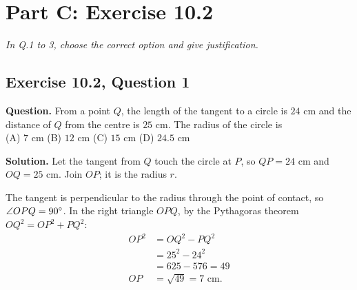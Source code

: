 \newpage
\section*{Part C: Exercise 10.2}

\textit{In Q.1 to 3, choose the correct option and give justification.}

\subsection*{Exercise 10.2, Question 1}
\textbf{Question.} From a point $Q$, the length of the tangent to a circle is $24$ cm and the distance of $Q$ from the centre is $25$ cm. The radius of the circle is\\
(A) $7$ cm \qquad (B) $12$ cm \qquad (C) $15$ cm \qquad (D) $24.5$ cm

\begin{center}
%
\end{center}

\textbf{Solution.} Let the tangent from $Q$ touch the circle at $P$, so $QP=24$ cm and $OQ=25$ cm. Join $OP$; it is the radius $r$.

The tangent is perpendicular to the radius through the point of contact, so $\angle OPQ=90^\circ$. In the right triangle $OPQ$, by the Pythagoras theorem $OQ^2=OP^2+PQ^2$:
\begin{align*}
OP^2&=OQ^2-PQ^2\\
&=25^2-24^2\\
&=625-576=49\\
OP&=\sqrt{49}=7\text{ cm}.
\end{align*}

